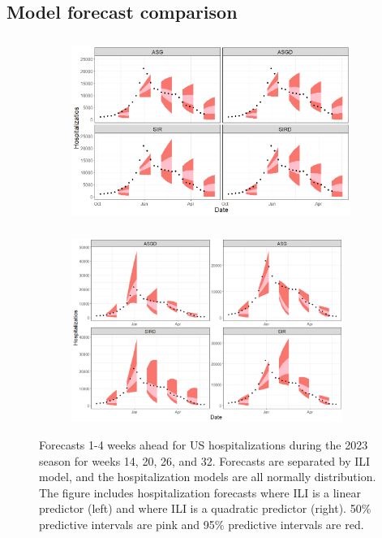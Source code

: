 \documentclass[ba]{imsart}
\theoremstyle{plain}
\theoremstyle{definition}
\theoremstyle{remark}
\begin{document}
\begin{supplement}
\newpage
\section{Model forecast comparison}

\begin{figure}[hbt!]
\centering
\begin{subfigure}
  \centering
  \includegraphics[width=.49\linewidth,height=6cm]{Images/normal_forecasts_us.png}
\end{subfigure}%
\begin{subfigure}
  \centering
  \includegraphics[width=.49\linewidth, height=6cm]{Images/normal_sq_forecasts_us.png}
\end{subfigure}
\caption{Forecasts 1-4 weeks ahead for US hospitalizations during the 2023 
season for weeks 14, 20, 26, and 32. Forecasts are separated by ILI model, 
and the hospitalization models are all normally distribution. The figure 
includes hospitalization forecasts where ILI is a linear predictor (left) 
and where ILI is a quadratic predictor (right). 50\% predictive intervals 
are pink and 95\% predictive intervals are red.}
\label{fig:normal_flu_forecasts}
\end{figure}


\begin{figure}[hbt!]
    

\end{figure}
\end{supplement}
\end{document}
